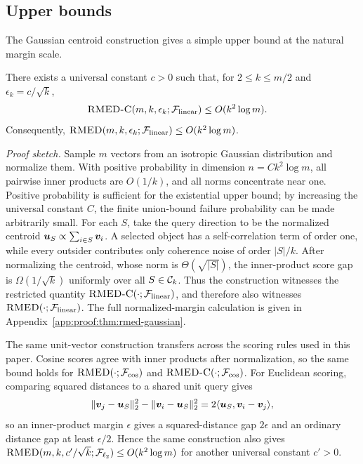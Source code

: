 \documentclass{article}
\begin{document}
\subsection{Upper bounds}

The Gaussian centroid construction gives a simple upper bound at the natural margin scale.

\begin{theorem}\label{thm:rmed-gaussian}
There exists a universal constant $c>0$ such that, for $2\leq k\leq m/2$ and $\epsilon_k=c/\sqrt{k}$,
\begin{align}
    \textsc{RMED-C}(m,k,\epsilon_k;\mathcal{F}_{\rm linear})
    &\leq
    O(k^2\log m).
    \label{eq:rmed-gaussian}
\end{align}
Consequently, $\textsc{RMED}(m,k,\epsilon_k;\mathcal{F}_{\rm linear})\leq O(k^2\log m)$.
\end{theorem}

\noindent\textit{Proof sketch.}
Sample $m$ vectors from an isotropic Gaussian distribution and normalize them. With positive probability in dimension $n=Ck^2\log m$, all pairwise inner products are $O(1/k)$, and all norms concentrate near one. Positive probability is sufficient for the existential upper bound; by increasing the universal constant $C$, the finite union-bound failure probability can be made arbitrarily small. For each $S$, take the query direction to be the normalized centroid $\bm{u}_S\propto \sum_{i\in S}\bm{v}_i$. A selected object has a self-correlation term of order one, while every outsider contributes only coherence noise of order $|S|/k$. After normalizing the centroid, whose norm is $\Theta(\sqrt{|S|})$, the inner-product score gap is $\Omega(1/\sqrt{k})$ uniformly over all $S\in\mathcal{C}_k$. Thus the construction witnesses the restricted quantity $\textsc{RMED-C}(\cdot;\mathcal{F}_{\rm linear})$, and therefore also witnesses $\textsc{RMED}(\cdot;\mathcal{F}_{\rm linear})$. The full normalized-margin calculation is given in Appendix~\ref{app:proof:thm:rmed-gaussian}.

The same unit-vector construction transfers across the scoring rules used in this paper. Cosine scores agree with inner products after normalization, so the same bound holds for $\textsc{RMED}(\cdot;\mathcal{F}_{\cos})$ and $\textsc{RMED-C}(\cdot;\mathcal{F}_{\cos})$. For Euclidean scoring, comparing squared distances to a shared unit query gives
\[
    \|\bm{v}_j-\bm{u}_S\|_2^2-\|\bm{v}_i-\bm{u}_S\|_2^2
    =
    2\langle \bm{u}_S,\bm{v}_i-\bm{v}_j\rangle ,
\]
so an inner-product margin $\epsilon$ gives a squared-distance gap $2\epsilon$ and an ordinary distance gap at least $\epsilon/2$. Hence the same construction also gives $\textsc{RMED}(m,k,c'/\sqrt{k};\mathcal{F}_{\ell_{2}})\leq O(k^2\log m)$ for another universal constant $c'>0$.
\end{document}
